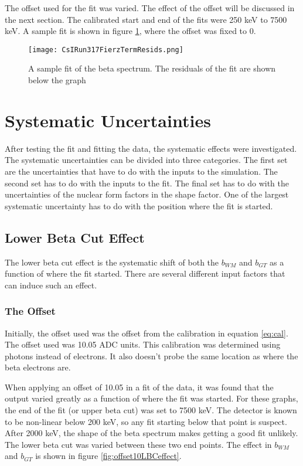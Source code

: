 \documentclass[../MaxHughesThesis.tex]{subfiles}
\begin{document}
The offset used for the fit was varied.
The effect of the offset will be discussed in the next section. 
The calibrated start and end of the fits were 250 keV to 7500 keV. 
A sample fit is shown in figure \ref{fig:samplefit}, where the offset was fixed to 0.

\begin{figure}[!htb]
	\centerline{\texttt{[image: CsIRun317FierzTermResids.png]}}
	\caption{A sample fit of the beta spectrum. 
		 The residuals of the fit are shown below the graph}
	\label{fig:samplefit}
\end{figure}

\section{Systematic Uncertainties}

After testing the fit and fitting the data, the systematic effects were investigated.
The systematic uncertainties can be divided into three categories.
The first set are the uncertainties that have to do with the inputs to the simulation.
The second set has to do with the inputs to the fit.
The final set has to do with the uncertainties of the nuclear form factors in the shape factor. 
One of the largest systematic uncertainty has to do with the position where the fit is started. 

\subsection{Lower Beta Cut Effect}

The lower beta cut effect is the systematic shift of both the $b_{WM}$ and $b_{GT}$ as a function of where the fit started.
There are several different input factors that can induce such an effect.

\subsubsection{The Offset}
Initially, the offset used was the offset from the calibration in equation \ref{eq:cal}.
The offset used was 10.05 ADC units.
This calibration was determined using photons instead of electrons.
It also doesn't probe the same location as where the beta electrons are.

When applying an offset of 10.05 in a fit of the data, it was found that the output varied greatly as a function of where the fit was started.
For these graphs, the end of the fit (or upper beta cut) was set to 7500 keV.
The detector is known to be non-linear below 200 keV, so any fit starting below that point is suspect. 
After 2000 keV, the shape of the beta spectrum makes getting a good fit unlikely.
The lower beta cut was varied between these two end points.
The effect in $b_{WM}$ and $b_{GT}$ is shown in figure \ref{fig:offset10LBCeffect}.
\end{document}
